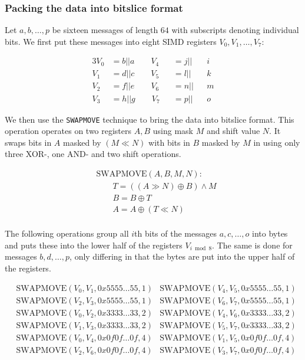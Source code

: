 \documentclass[12pt]{report}
\begin{document}
\subsubsection{Packing the data into bitslice format}

Let $a,b,\dots,p$ be sixteen messages of length $64$ with subscripts denoting
individual bits. We first put these messages into eight SIMD registers
$V_0,V_1,\dots,V_7$:

\begin{alignat*}{3}
    V_0&=b||a\qquad V_4&&=j||&&i \\
    V_1&=d||c\qquad V_5&&=l||&&k \\
    V_2&=f||e\qquad V_6&&=n||&&m \\
    V_3&=h||g\qquad V_7&&=p||&&o
\end{alignat*}

We then use the \texttt{SWAPMOVE} technique to bring the data into bitslice
format. This operation operates on two registers $A,B$ using mask $M$ and shift
value $N$. It swaps bits in $A$ masked by $(M\ll N)$ with bits in $B$ masked by
$M$ in using only three XOR-, one AND- and two shift operations.

\begin{align*}
    &\text{SWAPMOVE}(A,B,M,N): \\
    &\qquad T=((A\gg N)\oplus B)\land M \\
    &\qquad B=B\oplus T \\
    &\qquad A=A\oplus (T\ll N) \\
\end{align*}

The following operations group all $i$th bits of the messages $a,c,\dots,o$
into bytes and puts these into the lower half of the registers $V_{i\bmod 8}$.
The same is done for messages $b,d,\dots,p$, only differing in that the bytes
are put into the upper half of the registers.

\begin{align*}
    &\text{SWAPMOVE}(V_0,V_1,0x5555\dots 55,1) &\text{SWAPMOVE}(V_4,V_5,0x5555\dots 55,1) \\
    &\text{SWAPMOVE}(V_2,V_3,0x5555\dots 55,1) &\text{SWAPMOVE}(V_6,V_7,0x5555\dots 55,1) \\
    &\text{SWAPMOVE}(V_0,V_2,0x3333\dots 33,2) &\text{SWAPMOVE}(V_4,V_6,0x3333\dots 33,2) \\
    &\text{SWAPMOVE}(V_1,V_3,0x3333\dots 33,2) &\text{SWAPMOVE}(V_5,V_7,0x3333\dots 33,2) \\
    &\text{SWAPMOVE}(V_0,V_4,0x0f0f\dots 0f,4) &\text{SWAPMOVE}(V_1,V_5,0x0f0f\dots 0f,4) \\
    &\text{SWAPMOVE}(V_2,V_6,0x0f0f\dots 0f,4) &\text{SWAPMOVE}(V_3,V_7,0x0f0f\dots 0f,4) \\
\end{align*}
\end{document}
